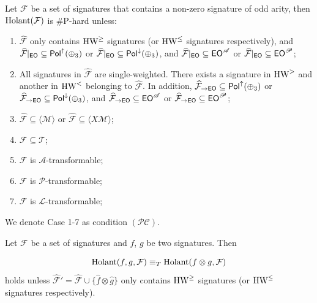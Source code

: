 \begin{theorem}\label{thm: holant odd}
    Let $\mathcal{F}$ be a set of signatures that contains a non-zero signature of odd arity, then $\operatorname{Holant}(\mathcal{F})$ is \#P-hard unless:
    \begin{enumerate}
        \item $\widehat{\mathcal{F}}$ only contains $\text{HW}^\geq$ signatures (or $\text{HW}^\leq$ signatures respectively), and $\widehat{\mathcal{F}}|_{\textup{\textsf{EO}}}\subseteq \mathsf{Pol}^\uparrow(\oplus_3)$ or $\widehat{\mathcal{F}}|_{\textup{\textsf{EO}}}\subseteq \mathsf{Pol}^\downarrow(\oplus_3)$, and $\widehat{\mathcal{F}}|_{\textup{\textsf{EO}}}\subseteq \textup{\textsf{EO}}^\mathscr{A}$ or $\widehat{\mathcal{F}}|_{\textup{\textsf{EO}}}\subseteq \textup{\textsf{EO}}^\mathscr{P}$;
        
        \item 
        All signatures in $\widehat{\mathcal{F}}$ are single-weighted. 
        There exists a signature in $\text{HW}^>$ and another in $\text{HW}^<$ belonging to $\widehat{\mathcal{F}}$.  
        In addition, $\widehat{\mathcal{F}}_{\to\textup{\textsf{EO}}}\subseteq \mathsf{Pol}^\uparrow(\oplus_3)$ or $\widehat{\mathcal{F}}_{\to\textup{\textsf{EO}}}\subseteq \mathsf{Pol}^\downarrow(\oplus_3)$, and $\widehat{\mathcal{F}}_{\to\textup{\textsf{EO}}}\subseteq \textup{\textsf{EO}}^\mathscr{A}$ or $\widehat{\mathcal{F}}_{\to\textup{\textsf{EO}}}\subseteq \textup{\textsf{EO}}^\mathscr{P}$;

        

        \item $\widehat{\mathcal{F}}\subseteq\langle \mathcal{M}\rangle$ or $\widehat{\mathcal{F}}\subseteq\langle X\mathcal{M}\rangle$;

        \item $\mathcal{F}\subseteq\mathscr{T}$;
        
        \item $\mathcal{F}$ is $\mathscr{A}$-transformable;

        \item $\mathcal{F}$ is $\mathscr{P}$-transformable;

        \item $\mathcal{F}$ is $\mathscr{L}$-transformable;
    \end{enumerate}
    We denote Case 1-7 as condition $(\mathcal{PC})$.
\end{theorem}

\begin{theorem}\label{thm: decomposition lemma}
    Let $\mathcal{F}$ be a set of signatures and $f$, $g$ be two signatures. Then

$$\operatorname{Holant}(f,g,\mathcal{F})\equiv_T\operatorname{Holant}(f\otimes g,\mathcal{F})$$ 
holds unless $\widehat{\mathcal{F}}'=\widehat{\mathcal{F}}\cup\{\widehat{f}\otimes\widehat{g}\}$ only contains $\text{HW}^\geq$ signatures (or $\text{HW}^\leq$ signatures respectively).
\end{theorem}




